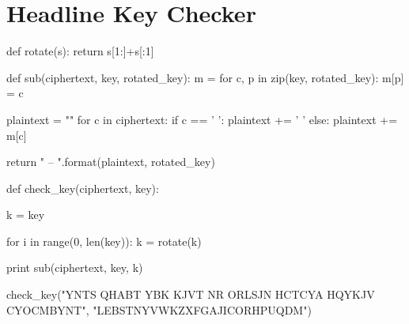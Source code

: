 \documentclass[11pt,a4paper,twoside]{article}
\begin{document}
\section{Headline Key Checker}
\label{Headline_checker}
\begin{python}
def rotate(s):
    return s[1:]+s[:1]

def sub(ciphertext, key, rotated_key):
    m = {}
    for c, p in zip(key, rotated_key):
        m[p] = c
    
    plaintext = ""
    for c in ciphertext:
        if c == ' ':
            plaintext += ' '
        else:
            plaintext += m[c]
    
    return "{} -- {}".format(plaintext, rotated_key)
    

def check_key(ciphertext, key):
    
    k = key
    
    for i in range(0, len(key)):
        k = rotate(k)
        
        print sub(ciphertext, key, k)


check_key("YNTS QHABT YBK KJVT NR ORLSJN HCTCYA HQYKJV CYOCMBYNT", 
          "LEBSTNYVWKZXFGAJICORHPUQDM")
\end{python}

\end{document}

